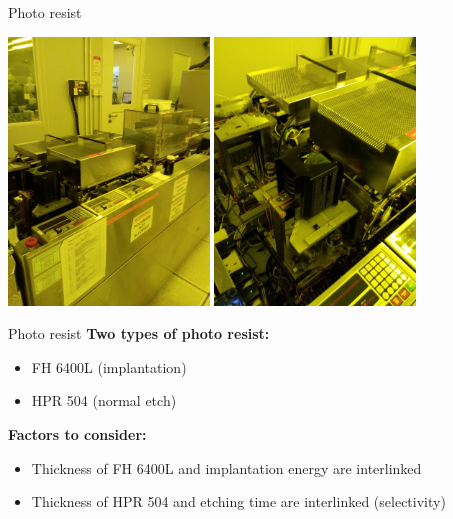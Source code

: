 \documentclass[9pt]{beamer}
\begin{document}
\begin{frame}{Photo resist}
\begin{center}
\includegraphics[width=0.4\textwidth]{images/20181128_154907.jpg}
\includegraphics[width=0.4\textwidth]{images/20181128_154911.jpg}
\end{center}
\end{frame}

\begin{frame}{Photo resist}
	\textbf{Two types of photo resist:}
	\begin{itemize}
		\item FH 6400L (implantation)
		\item HPR 504 (normal etch)
	\end{itemize}

	\textbf{Factors to consider:}
	\begin{itemize}
		\item Thickness of FH 6400L and implantation energy are interlinked
		\item Thickness of HPR 504 and etching time are interlinked (selectivity)
	\end{itemize}
\end{frame}
\end{document}
